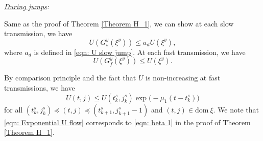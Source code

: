 \noindent\emph{\underline{During jumps}:} 

Same as the proof of Theorem \ref{Theorem H_1}, we can show at each slow transmission, we have
\begin{equation}
    U(G_s^y(\xi^y)) \leq a_d U(\xi^y),
    \label{eqn: Exponential U slow jump}
\end{equation}
where $a_d$ is defined in \eqref{eqn: U slow jump}. At each fast transmission, we have 
\begin{equation*}
    U(G_f^y(\xi^y)) \leq U(\xi^y).
\end{equation*}



By comparison principle \cite[Lemma 3.4]{nonlinear_systems_Khalil} and the fact that $U$ is non-increasing at fast transmissions, we have
\begin{equation}
    U(t,j) \leq U(t_k^s, j_k^s) \exp \! \big(-\mu_1(t-t_k^s) \big) %
\end{equation}
for all $(t_k^s, j_k^s) \preceq (t,j) \preceq (t_{k+1}^s, j_{k+1}^s - 1)$ and $(t,j)\in \text{dom}\ \xi$. We note that \eqref{eqn: Exponential U flow} corresponds to \eqref{eqn: beta 1} in the proof of Theorem \ref{Theorem H_1}.










